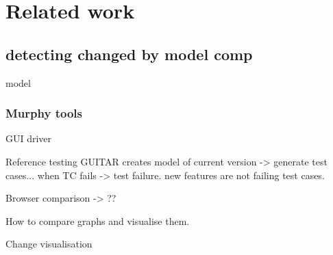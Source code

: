 \chapter{Related work}


\section{detecting changed by model comp} 

model 

\subsection{Murphy tools}

GUI driver 

Reference testing GUITAR creates model of current version -> generate test cases... when TC fails -> test failure. 
new features are not failing test cases. 

Browser comparison -> ??

How to compare graphs and visualise them. 

Change visualisation


